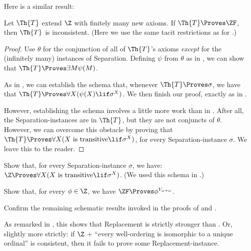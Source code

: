 \documentclass[../../../include/open-logic-section]{subfiles}
\begin{document}
Here is a similar result:

\begin{prop}
	Let $\Th{T}$ extend $\Z$ with finitely many new axioms. If $\Th{T} \Proves \ZF$, then $\Th{T}$ is inconsistent. (Here we use the same tacit restrictions as for .)
\end{prop}
\begin{proof}
	Use $\theta$ for the conjunction of all of $\Th{T}$'s axioms \emph{except} for the (infinitely many) instances of Separation. Defining $\psi$ from $\theta$ as in , we can show that $\Th{T} \Proves \exists M \psi(M)$. 
	
	As in , we can establish the schema that, whenever $\Th{T} \Proves \sigma$, we have that $\Th{T} \Proves \forall X(\psi(X) \lif \sigma^X)$. We then finish our proof, exactly as in .
	
	However, establishing the schema involves a little more work than in . After all, the Separation-instances are in $\Th{T}$, but they are not conjuncts of $\theta$. However, we can overcome this obstacle by proving that $\Th{T} \Proves \forall X(X\text{ is transitive} \lif \sigma^X)$, for every Separation-instance $\sigma$. We leave this to the reader. 
\end{proof}
\begin{prob}
	Show that, for every Separation-instance $\sigma$, we have: $\Z \Proves \forall X(X\text{ is transitive} \lif \sigma^X)$. (We used this schema in .)
\end{prob}
\begin{prob}
	Show that, for every $\phi \in \Z$, we have $\ZF \Proves \phi^{V_{\omega+\omega}}$.
\end{prob}
\begin{prob}
	Confirm the remaining schematic results invoked in the proofs of  and  .
\end{prob}

As remarked in , this shows that Replacement is strictly stronger than
. Or, slightly more strictly: if $\Z$ + ``every well-ordering is isomorphic to a unique ordinal'' is consistent, then it fails to prove some Replacement-instance.


\end{document}
